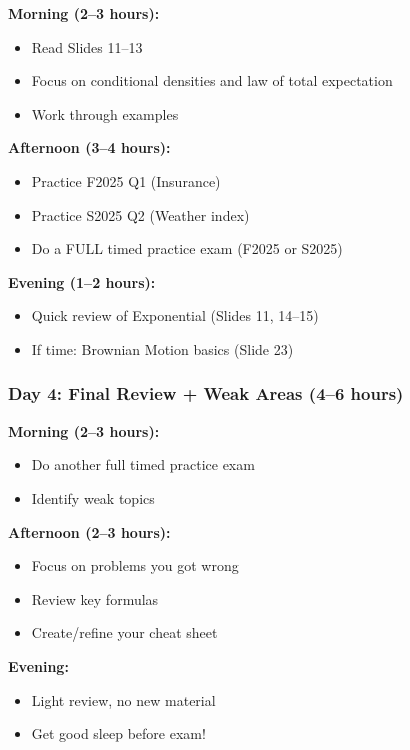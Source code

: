 \documentclass[11pt,letterpaper]{article}
\begin{document}
\textbf{Morning (2--3 hours):}
\begin{itemize}[leftmargin=*]
  \item Read Slides 11--13
  \item Focus on conditional densities and law of total expectation
  \item Work through examples
\end{itemize}

\textbf{Afternoon (3--4 hours):}
\begin{itemize}[leftmargin=*]
  \item Practice F2025 Q1 (Insurance)
  \item Practice S2025 Q2 (Weather index)
  \item Do a FULL timed practice exam (F2025 or S2025)
\end{itemize}

\textbf{Evening (1--2 hours):}
\begin{itemize}[leftmargin=*]
  \item Quick review of Exponential (Slides 11, 14--15)
  \item If time: Brownian Motion basics (Slide 23)
\end{itemize}

\subsubsection{Day 4: Final Review + Weak Areas (4--6 hours)}

\textbf{Morning (2--3 hours):}
\begin{itemize}[leftmargin=*]
  \item Do another full timed practice exam
  \item Identify weak topics
\end{itemize}

\textbf{Afternoon (2--3 hours):}
\begin{itemize}[leftmargin=*]
  \item Focus on problems you got wrong
  \item Review key formulas
  \item Create/refine your cheat sheet
\end{itemize}

\textbf{Evening:}
\begin{itemize}[leftmargin=*]
  \item Light review, no new material
  \item Get good sleep before exam!
\end{itemize}
\end{document}
